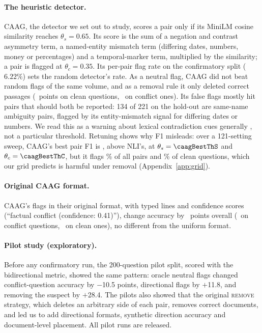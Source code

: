 \paragraph{The heuristic detector.}
CAAG, the detector we set out to study, scores a pair only if its MiniLM \citep{reimers2019sbert} cosine similarity reaches $\theta_s=0.65$. Its score
is the sum of a negation and contrast asymmetry term, a named-entity mismatch term (differing dates, numbers, money or
percentages) and a temporal-marker term, multiplied by the similarity; a pair is flagged at
$\theta_c=0.35$. Its per-pair flag rate on the confirmatory split ($6.22\%$) sets the random detector's rate.
As a neutral flag, CAAG did not beat random flags of the same volume, and
as a removal rule it only deleted correct passages (\dCaagRemClean\ points on clean questions, \dCaagRemConf\ on
conflict ones). Its false flags mostly hit pairs that should both be reported: 134 of 221 on the
hold-out are same-name ambiguity pairs, flagged by its entity-mismatch signal for differing dates or
numbers. We read this as a warning about lexical contradiction cues generally \citep{gururangan2018annotation},
not a particular threshold. Retuning shows why F1 misleads: over a 121-setting sweep, CAAG's
best pair F1 is \caagBestFOne, above NLI's, at $\theta_s=\caagBestThS$ and $\theta_c=\caagBestThC$, but it flags \caagBestRate\% of all pairs and \caagBestCleanFpr\% of clean questions, which our grid predicts
is harmful under removal (Appendix~\ref{app:grid}).

\paragraph{Original CAAG format.}
CAAG's flags in their original format, with typed lines and confidence scores (``factual conflict (confidence:
0.41)''), change accuracy by \origCaagAll\ points overall (\origCaagConf\ on conflict questions, \origCaagClean\ on
clean ones), no different from the uniform format.

\paragraph{Pilot study (exploratory).}
Before any confirmatory run, the 200-question pilot split, scored with the bidirectional metric, showed the same
pattern: oracle neutral flags changed conflict-question accuracy by $-$10.5 points, directional flags by
$+$11.8, and removing the suspect by $+$28.4. The pilots also showed that the original \textsc{remove} strategy,
which deletes an arbitrary side of each pair, removes correct documents, and led us to add directional formats,
synthetic direction accuracy and document-level placement. All pilot runs are released.

